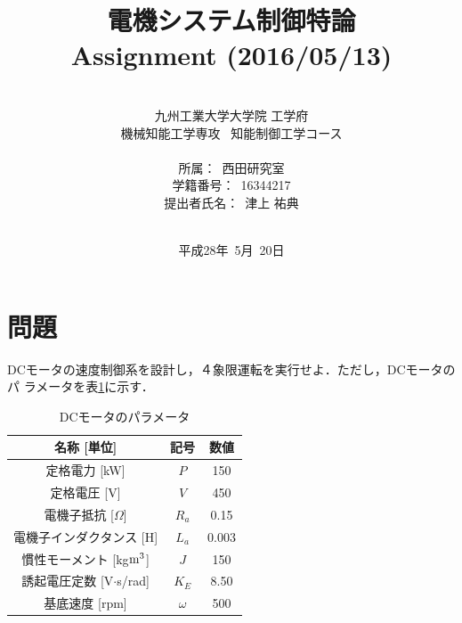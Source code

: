 \documentclass[a4paper,12pt]{jarticle}
\title{電機システム制御特論 \\
Assignment (2016/05/13)\\
}
\author{\vspace{40mm}\\
九州工業大学大学院 \hspace{0mm} 工学府\\
機械知能工学専攻\ \hspace{0mm} 知能制御工学コース \\
\vspace{5mm}\\
所属：\ 西田研究室\\
学籍番号：\ 16344217\\
提出者氏名：\ 津上 \hspace{0mm} 祐典\\\vspace{5mm}\\ }
\date{平成28年\ 5月\ 20日}
\begin{document}
\titlepage
\maketitle
\thispagestyle{empty}

\newpage

\thispagestyle{empty}
\tableofcontents

\newpage
\setcounter{page}{1}
\section{問題}
DCモータの速度制御系を設計し，４象限運転を実行せよ．ただし，DCモータのパ
ラメータを表\ref{table:DC_dim}に示す．
%
\begin{table}[h]
 \centering
 \caption{DCモータのパラメータ}
 \label{table:DC_dim}
 \begin{tabular}{c|c|c} \hline
  名称 [単位]                    & 記号  & 数値\\\hline
  定格電力 [kW]                  &$P$    &150  \\\hline
  定格電圧 [V]                   &$V$    &450  \\\hline
  電機子抵抗 [$\Omega$]          &$R_a$  & 0.15 \\\hline
  電機子インダクタンス [H]        &$L_a$   &0.003\\\hline
  慣性モーメント [kg$\rm {m^3}$] &$J$     &150  \\\hline
  誘起電圧定数 [V$\cdot$s/rad]    &$K_E$   &8.50 \\\hline
  基底速度 [rpm]                &$\omega$&500  \\\hline
 \end{tabular}
\end{table}
%
\end{document}
